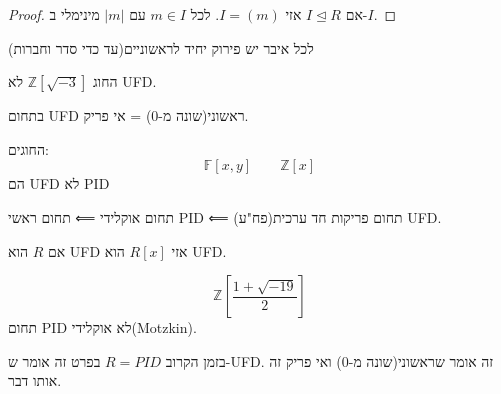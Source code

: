 \documentclass{tstextbook}
\begin{document}
\begin{proof}
אם \(I\trianglelefteq R\) אזי \(I=(m)\). לכל \(m \in I\) עם \(\lvert m \rvert\) מינימלי ב-\(I\).

\end{proof}
\begin{definition}
לכל איבר יש פירוק יחיד לראשוניים(עד כדי סדר וחברות)

\end{definition}
\begin{example}
החוג \(\mathbb{Z}[\sqrt{ -3 }]\) לא UFD.

\end{example}
\begin{proposition}
בתחום UFD ראשוני(שונה מ-0) = אי פריק.

\end{proposition}
\begin{example}
החוגים:
$$\mathbb{F} [x,y]\qquad \mathbb{Z} [x]$$
הם UFD לא PID

\end{example}
\begin{proposition}
תחום אוקלידי ⟸ תחום ראשי PID ⟸ תחום פריקות חד ערכית(פח"ע) UFD.

\end{proposition}
\begin{proposition}
אם \(R\) הוא UFD אזי \(R[x]\) הוא UFD.

\end{proposition}
\begin{example}
$$\mathbb{Z}\left[ \frac{1+\sqrt{ -19 }}{2} \right]$$
תחום PID לא אוקלידי(Motzkin).

\end{example}
בזמן הקרוב \(R=PID\) בפרט זה אומר ש-UFD. זה אומר שראשוני(שונה מ-0) ואי פריק זה אותו דבר.
\end{document}
